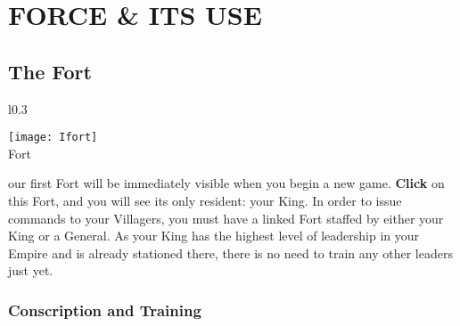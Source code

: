
\chapter[Force \& Its Use]{{\Huge {\Huge F}}ORCE {\Huge \&} {\huge I}TS {\Huge U}SE}


\section{\textsf{The Fort}}

\begin{wrapfigure}{l}{0.3\textwidth}
    \vspace{-20pt}
    \begin{center}
        \texttt{[image: Ifort]}
        \\ Fort
    \end{center}
    \vspace{-30pt} %
    \end{wrapfigure}

our first Fort will be immediately visible when you begin a new game. \textbf{Click} on this Fort, and you will see its only resident: your King. In order to issue commands to your Villagers, you must have a linked Fort staffed by either your King or a General. As your King has the highest level of leadership in your Empire and is already stationed there, there is no need to train any other leaders just yet.

\subsection{\textsf{Conscription and Training}}

